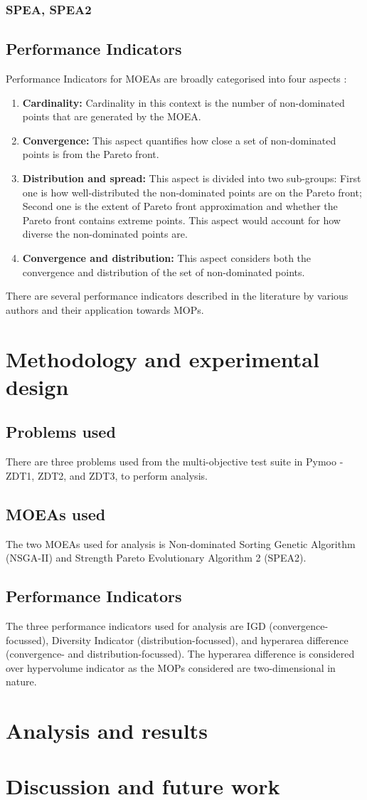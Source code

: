 \documentclass[sigconf,nonacm]{acmart}
\begin{document}
\subsubsection{SPEA, SPEA2}
\subsection{Performance Indicators}
Performance Indicators for MOEAs are broadly categorised into four aspects \cite{audet2022}:
\begin{enumerate}
\item\textbf{Cardinality:} Cardinality in this context is the number of non-dominated points that are generated by the MOEA.
\item\textbf{Convergence:} This aspect quantifies how close a set of non-dominated points is from the Pareto front.
\item\textbf{Distribution and spread:} This aspect is divided into two sub-groups: First one is how well-distributed the non-dominated points are on the Pareto front; Second one is the extent of Pareto front approximation and whether the Pareto front contains extreme points. This aspect would account for how diverse the non-dominated points are.
\item\textbf{Convergence and distribution:} This aspect considers both the convergence and distribution of the set of non-dominated points.
\end{enumerate}
There are several performance indicators described in the literature by various authors and their application towards MOPs.

\section{Methodology and experimental design}
\subsection{Problems used}
There are three problems used from the multi-objective test suite in Pymoo - ZDT1, ZDT2, and ZDT3, to perform analysis.
\subsection{MOEAs used}
The two MOEAs used for analysis is Non-dominated Sorting Genetic Algorithm (NSGA-II) and Strength Pareto Evolutionary Algorithm 2 (SPEA2).
\subsection{Performance Indicators}
The three performance indicators used for analysis are IGD (convergence-focussed), Diversity Indicator (distribution-focussed), and hyperarea difference (convergence- and distribution-focussed). The hyperarea difference is considered over hypervolume indicator as the MOPs considered are two-dimensional in nature.

\section{Analysis and results}

\section{Discussion and future work}


 
\end{document}
